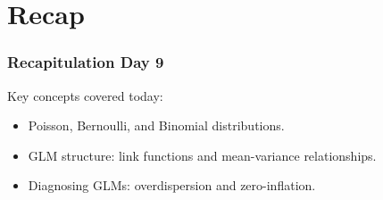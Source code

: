 \documentclass{beamer}
\begin{document}
\section{Recap}

\begin{frame}
    \frametitle{Recapitulation Day 9}
    Key concepts covered today:
    \begin{itemize}
        \item Poisson, Bernoulli, and Binomial distributions.
        \item GLM structure: link functions and mean-variance relationships.
        \item Diagnosing GLMs: overdispersion and zero-inflation.
    \end{itemize}
\end{frame}
\end{document}
